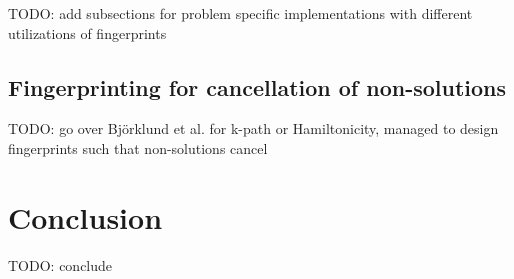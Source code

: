 TODO: add subsections for problem specific implementations with different utilizations of fingerprints

\subsection{Fingerprinting for cancellation of non-solutions}

TODO: go over Björklund et al. for k-path or Hamiltonicity, managed to design fingerprints such that non-solutions cancel

\section{Conclusion}

TODO: conclude
